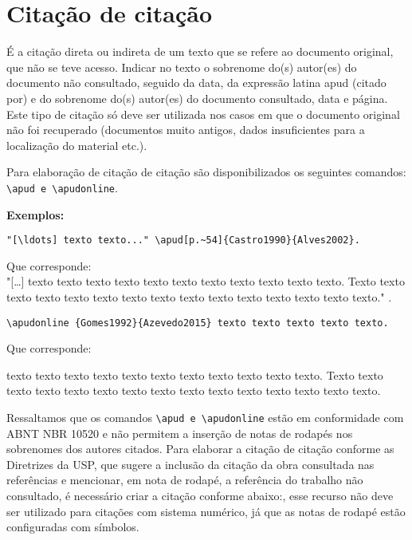 \section{Citação de citação}

É a citação direta ou indireta de um texto que se refere ao documento original, que não se teve acesso.
Indicar no texto o sobrenome do(s) autor(es) do documento não consultado, seguido da data, da expressão latina apud (citado por) e do sobrenome do(s) autor(es) do documento consultado, data e página. 
Este tipo de citação só deve ser utilizada nos casos em que o documento original não foi recuperado (documentos muito antigos, dados insuficientes para a localização do material etc.).

Para elaboração de citação de citação são disponibilizados os seguintes comandos: \verb+\apud e \apudonline+.

\textbf{Exemplos:}

\begin{alineas}

\item
\begin{verbatim}
"[\ldots] texto texto..." \apud[p.~54]{Castro1990}{Alves2002}. 
\end{verbatim}
Que corresponde: \\
"[\ldots] texto texto texto texto texto texto texto texto texto texto texto. Texto texto texto texto texto texto texto texto texto texto texto texto texto texto texto." .

\item
\begin{verbatim}
\apudonline {Gomes1992}{Azevedo2015} texto texto texto texto texto.
\end{verbatim}
Que corresponde:

 texto texto texto texto texto texto texto texto texto texto texto. Texto texto texto texto texto texto texto texto texto texto texto texto texto texto texto.
 
\end{alineas}

Ressaltamos que os comandos \verb+\apud e \apudonline+ estão em conformidade com ABNT NBR 10520 e não permitem a inserção de notas de rodapés nos sobrenomes dos autores citados. Para elaborar a citação de citação conforme as Diretrizes da USP, que sugere a inclusão da citação da obra consultada nas referências e mencionar, em nota de rodapé, a referência do trabalho não consultado, é necessário criar a citação conforme abaixo:, esse recurso não deve ser utilizado para citações com sistema numérico, já que as notas de rodapé estão configuradas com símbolos. 

